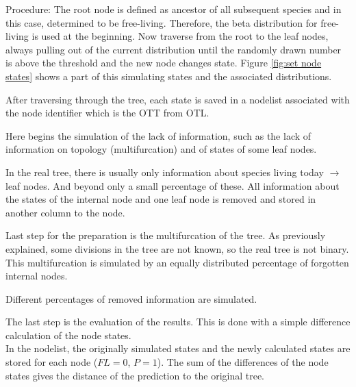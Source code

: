     Procedure: The root node is defined as ancestor of all subsequent species and in this case, 
      determined to be free-living. Therefore, the beta distribution for free-living is used at the 
      beginning. Now traverse from the root to the leaf nodes, always pulling out of the current 
      distribution until the randomly drawn number is above the threshold and the new node changes 
      state. Figure \ref{fig:set node states} shows a part of this simulating states and the 
      associated distributions.

    After traversing through the tree, each state is saved in a nodelist associated with the node 
      identifier which is the OTT from OTL.

    Here begins the simulation of the lack of information, such as the lack of information on topology 
      (multifurcation) and of states of some leaf nodes.

    In the real tree, there is usually only information about species living today $\rightarrow$ leaf 
      nodes. And beyond only a small percentage of these. All information about the states of the 
      internal node and one leaf node is removed and stored in another column to the node.

    Last step for the preparation is the multifurcation of the tree. As previously explained, some 
      divisions in the tree are not known, so the real tree is not binary. This multifurcation is 
      simulated by an equally distributed percentage of forgotten internal nodes.
    
    Different percentages of removed information are simulated.
  
    The last step is the evaluation of the results. This is done with a simple difference calculation 
      of the node states. \\
    In the nodelist, the originally simulated states and the newly calculated states are stored for 
      each node ($FL = 0$, $P = 1$). The sum of the differences of the node states gives the distance 
      of the prediction to the original tree.

